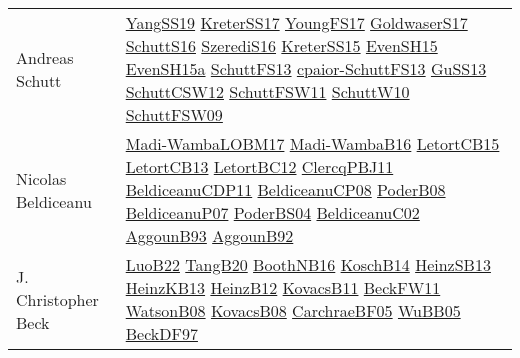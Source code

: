 {\begin{longtable}{p{4cm}p{20cm}}
Andreas Schutt & \href{papers/YangSS19.pdf}{YangSS19}\cite{YangSS19} \href{articles/KreterSS17.pdf}{KreterSS17}\cite{KreterSS17} \href{papers/YoungFS17.pdf}{YoungFS17}\cite{YoungFS17} \href{papers/GoldwaserS17.pdf}{GoldwaserS17}\cite{GoldwaserS17} \href{papers/SchuttS16.pdf}{SchuttS16}\cite{SchuttS16} \href{papers/SzerediS16.pdf}{SzerediS16}\cite{SzerediS16} \href{papers/KreterSS15.pdf}{KreterSS15}\cite{KreterSS15} \href{papers/EvenSH15.pdf}{EvenSH15}\cite{EvenSH15} \href{articles/EvenSH15a.pdf}{EvenSH15a}\cite{EvenSH15a} \href{papers/SchuttFS13.pdf}{SchuttFS13}\cite{SchuttFS13} \href{papers/cpaior-SchuttFS13.pdf}{cpaior-SchuttFS13}\cite{cpaior-SchuttFS13} \href{papers/GuSS13.pdf}{GuSS13}\cite{GuSS13} \href{papers/SchuttCSW12.pdf}{SchuttCSW12}\cite{SchuttCSW12} \href{articles/SchuttFSW11.pdf}{SchuttFSW11}\cite{SchuttFSW11} \href{papers/SchuttW10.pdf}{SchuttW10}\cite{SchuttW10} \href{papers/SchuttFSW09.pdf}{SchuttFSW09}\cite{SchuttFSW09} \\
Nicolas Beldiceanu & \href{papers/Madi-WambaLOBM17.pdf}{Madi-WambaLOBM17}\cite{Madi-WambaLOBM17} \href{papers/Madi-WambaB16.pdf}{Madi-WambaB16}\cite{Madi-WambaB16} \href{articles/LetortCB15.pdf}{LetortCB15}\cite{LetortCB15} \href{papers/LetortCB13.pdf}{LetortCB13}\cite{LetortCB13} \href{papers/LetortBC12.pdf}{LetortBC12}\cite{LetortBC12} \href{papers/ClercqPBJ11.pdf}{ClercqPBJ11}\cite{ClercqPBJ11} \href{articles/BeldiceanuCDP11.pdf}{BeldiceanuCDP11}\cite{BeldiceanuCDP11} \href{papers/BeldiceanuCP08.pdf}{BeldiceanuCP08}\cite{BeldiceanuCP08} \href{papers/PoderB08.pdf}{PoderB08}\cite{PoderB08} \href{papers/BeldiceanuP07.pdf}{BeldiceanuP07}\cite{BeldiceanuP07} \href{articles/PoderBS04.pdf}{PoderBS04}\cite{PoderBS04} \href{papers/BeldiceanuC02.pdf}{BeldiceanuC02}\cite{BeldiceanuC02} \href{articles/AggounB93.pdf}{AggounB93}\cite{AggounB93} \href{}{AggounB92}\cite{AggounB92} \\
J. Christopher Beck & \href{papers/LuoB22.pdf}{LuoB22}\cite{LuoB22} \href{papers/TangB20.pdf}{TangB20}\cite{TangB20} \href{papers/BoothNB16.pdf}{BoothNB16}\cite{BoothNB16} \href{papers/KoschB14.pdf}{KoschB14}\cite{KoschB14} \href{articles/HeinzSB13.pdf}{HeinzSB13}\cite{HeinzSB13} \href{papers/HeinzKB13.pdf}{HeinzKB13}\cite{HeinzKB13} \href{papers/HeinzB12.pdf}{HeinzB12}\cite{HeinzB12} \href{articles/KovacsB11.pdf}{KovacsB11}\cite{KovacsB11} \href{}{BeckFW11}\cite{BeckFW11} \href{papers/WatsonB08.pdf}{WatsonB08}\cite{WatsonB08} \href{articles/KovacsB08.pdf}{KovacsB08}\cite{KovacsB08} \href{papers/CarchraeBF05.pdf}{CarchraeBF05}\cite{CarchraeBF05} \href{papers/WuBB05.pdf}{WuBB05}\cite{WuBB05} \href{papers/BeckDF97.pdf}{BeckDF97}\cite{BeckDF97} \\

\end{longtable}}
